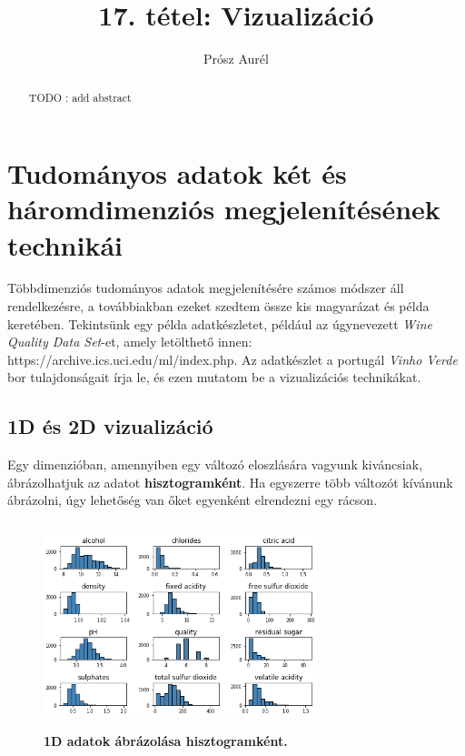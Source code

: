 \documentclass[12pt]{article}
\theoremstyle{plain}
\begin{document}
\title{17. tétel: Vizualizáció}
\author{Prósz Aurél}

\maketitle


\begin{abstract}
   TODO : add abstract
\end{abstract}

\vfill

\tableofcontents

\newpage

\section{Tudományos adatok két és háromdimenziós megjelenítésének technikái}
Többdimenziós tudományos adatok megjelenítésére számos módszer áll rendelkezésre, a továbbiakban ezeket szedtem össze kis magyarázat és példa keretében. \newline
Tekintsünk egy példa adatkészletet, például az úgynevezett \textit{Wine Quality Data Set}-et, amely letölthető innen:  https://archive.ics.uci.edu/ml/index.php. Az adatkészlet a portugál \textit{Vinho Verde} bor tulajdonságait írja le, és ezen mutatom be a vizualizációs technikákat. 


\subsection{1D és 2D vizualizáció}
Egy dimenzióban, amennyiben egy változó eloszlására vagyunk kiváncsiak, ábrázolhatjuk az adatot \textbf{hisztogramként}. Ha egyszerre több változót kívánunk ábrázolni, úgy lehetőség van őket egyenként elrendezni egy rácson. 

\begin{figure}[H]
    \centering
    \includegraphics[width=8cm, height=6cm]{media/hist.png}
    \caption{\textbf{1D adatok ábrázolása hisztogramként.}}
    \label{fig:GeneralDiagram}
 \end{figure}
 
\end{document}
